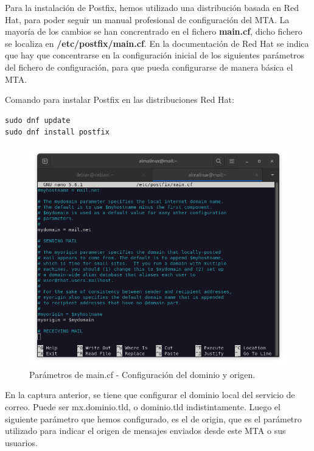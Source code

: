 Para la instalación de Postfix, hemos utilizado una distribución basada en Red Hat, para poder seguir un manual profesional de configuración del MTA. La mayoría de los cambios se han concrentrado en el fichero \textbf{main.cf}, dicho fichero se localiza en \textbf{/etc/postfix/main.cf}. En la documentación de Red Hat se indica que hay que concentrarse en la configuración inicial de los siguientes parámetros del fichero de configuración, para que pueda configurarse de manera básica el MTA.
\vspace{5mm}

Comando para instalar Postfix en las distribuciones Red Hat:

\begin{lstlisting}[style=mybash]
sudo dnf update
sudo dnf install postfix
\end{lstlisting}

\begin{figure}[H]
	\centering
	\includegraphics[scale=0.30]{02}
	\caption{Parámetros de main.cf - Configuración del dominio y origen.}
\end{figure}

En la captura anterior, se tiene que configurar el dominio local del servicio de correo. Puede ser mx.dominio.tld, o dominio.tld indistintamente. Luego el siguiente parámetro que hemos configurado, es el de origin, que es el parámetro utilizado para indicar el origen de mensajes enviados desde este MTA o sus usuarios.

